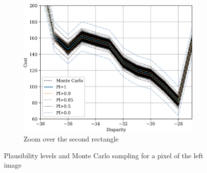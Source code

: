 \begin{figure}
\begin{subfigure}{0.45\linewidth}
        \includegraphics[width=\linewidth]{Images/cost_curve_100_120_zoom2.png}
        \caption{Zoom over the second rectangle}
        \label{fig:montecarlo_gauss_100_120_zoom2}
    \end{subfigure}
    \caption{Plausibility levels and Monte Carlo sampling for a pixel of the left image}
    \label{fig:montecarlo_gauss_100_120}
\end{figure}

